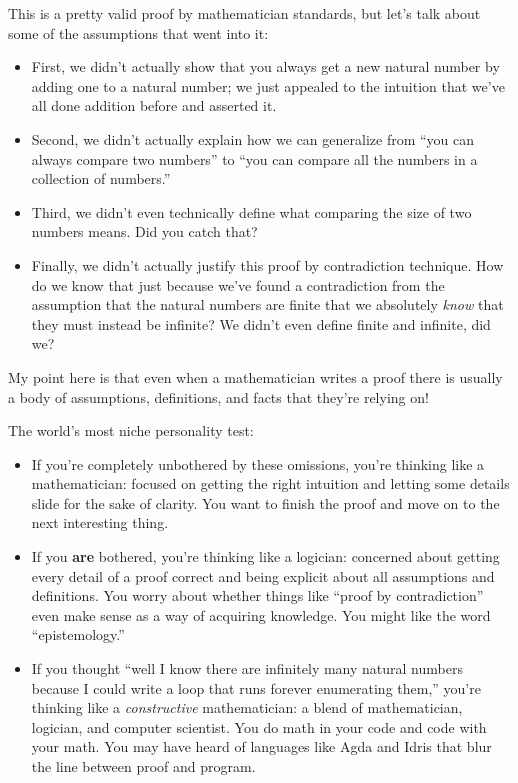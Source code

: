 \documentclass[11pt]{article}
\begin{document}
This is a pretty valid proof by mathematician standards, but let's talk about some of the assumptions that went into it:

\begin{itemize}
  \item First, we didn't actually show that you always get a new natural number by adding one to a natural number; we just appealed to the intuition that we've all done addition before and asserted it.
  \item Second, we didn't actually explain how we can generalize from ``you can always compare two numbers'' to ``you can compare all the numbers in a collection of numbers.''
  \item Third, we didn't even technically define what comparing the size of two numbers means. Did you catch that?
  \item Finally, we didn't actually justify this proof by contradiction technique. How do we know that just because we've found a contradiction from the assumption that the natural numbers are finite that we absolutely \emph{know} that they must instead be infinite? We didn't even define finite and infinite, did we?
\end{itemize}

My point here is that even when a mathematician writes a proof there is usually a body of assumptions, definitions, and facts that they're relying on!

The world's most niche personality test:
\begin{itemize}
  \item If you're completely unbothered by these omissions, you're thinking like a mathematician: focused on getting the right intuition and letting some details slide for the sake of clarity. You want to finish the proof and move on to the next interesting thing.
  \item If you \textbf{are} bothered, you're thinking like a logician: concerned about getting every detail of a proof correct and being explicit about all assumptions and definitions. You worry about whether things like ``proof by contradiction'' even make sense as a way of acquiring knowledge. You might like the word ``epistemology.''
  \item If you thought ``well I know there are infinitely many natural numbers because I could write a loop that runs forever enumerating them,'' you're thinking like a \emph{constructive} mathematician: a blend of mathematician, logician, and computer scientist. You do math in your code and code with your math. You may have heard of languages like Agda and Idris that blur the line between proof and program.
\end{itemize}
\end{document}
